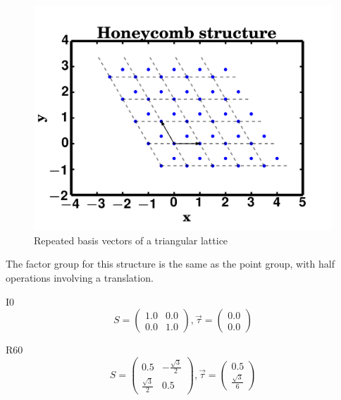 \documentclass[12pt, fleqn]{article}
\begin{document}
\begin{figure}[h]
    \begin{center}
        \includegraphics[max width=\textwidth]{./honeycomb.png}
    \end{center}
    \caption{Repeated basis vectors of a triangular lattice}
    \label{fig:honey}
\end{figure}

The factor group for this structure is the same as the point group, with half operations involving a translation.

I0
\begin{equation}
    S=
    \begin{pmatrix}
        1.0&0.0\\
        0.0&1.0
    \end{pmatrix}
    ,\vec{\tau}=
    \begin{pmatrix}
        0.0\\
        0.0
    \end{pmatrix}
    \label{I0}
\end{equation}

R60
\begin{equation}
    S=
    \begin{pmatrix}
        0.5&-\frac{\sqrt{3}}{2}\\
        \frac{\sqrt{3}}{2}&0.5
    \end{pmatrix}
    ,\vec{\tau}=
    \begin{pmatrix}
        0.5\\
        \frac{\sqrt{3}}{6}
    \end{pmatrix}
    \label{R60}
\end{equation}
\end{document}

